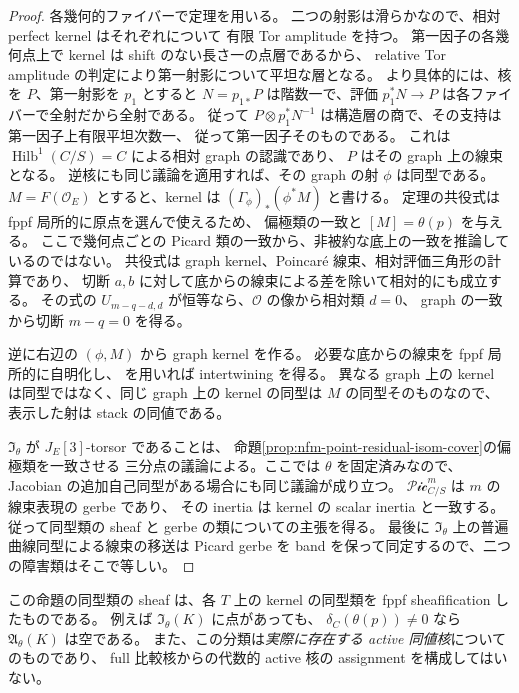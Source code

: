\begin{proof}
各幾何的ファイバーで定理を用いる。
二つの射影は滑らかなので、相対 perfect kernel はそれぞれについて
有限 Tor amplitude を持つ。
第一因子の各幾何点上で kernel は shift のない長さ一の点層であるから、
relative Tor amplitude の判定により第一射影について平坦な層となる。
より具体的には、核を $P$、第一射影を $p_1$ とすると
$N=p_{1*}P$ は階数一で、評価 $p_1^*N\to P$ は各ファイバーで全射だから全射である。
従って $P\otimes p_1^*N^{-1}$ は構造層の商で、その支持は第一因子上有限平坦次数一、
従って第一因子そのものである。
これは $\operatorname{Hilb}^1(C/S)=C$ による相対 graph の認識であり、
$P$ はその graph 上の線束となる。
逆核にも同じ議論を適用すれば、その graph の射 $\phi$ は同型である。
$M=F(\mathcal O_E)$ とすると、kernel は
$(\Gamma_\phi)_*(\phi^*M)$ と書ける。
定理の共役式は fppf 局所的に原点を選んで使えるため、
偏極類の一致と $[M]=\theta(p)$ を与える。
ここで幾何点ごとの Picard 類の一致から、非被約な底上の一致を推論しているのではない。
共役式は graph kernel、Poincar\'e 線束、相対評価三角形の計算であり、
切断 $a,b$ に対して底からの線束による差を除いて相対的にも成立する。
その式の $U_{m-q-d,d}$ が恒等なら、$\mathcal O$ の像から相対類 $d=0$、
graph の一致から切断 $m-q=0$ を得る。

逆に右辺の $(\phi,M)$ から graph kernel を作る。
必要な底からの線束を fppf 局所的に自明化し、
を用いれば intertwining を得る。
異なる graph 上の kernel は同型ではなく、同じ graph 上の kernel の同型は
$M$ の同型そのものなので、表示した射は stack の同値である。

$\mathfrak I_\theta$ が $J_E[3]$-torsor であることは、
命題\ref{prop:nfm-point-residual-isom-cover}の偏極類を一致させる
三分点の議論による。ここでは $\theta$ を固定済みなので、
Jacobian の追加自己同型がある場合にも同じ議論が成り立つ。
$\mathcal{Pic}^{m}_{C/S}$ は $m$ の線束表現の gerbe であり、
その inertia は kernel の scalar inertia と一致する。
従って同型類の sheaf と gerbe の類についての主張を得る。
最後に $\mathfrak I_\theta$ 上の普遍曲線同型による線束の移送は
Picard gerbe を band を保って同定するので、二つの障害類はそこで等しい。
\end{proof}

この命題の同型類の sheaf は、各 $T$ 上の kernel の同型類を
fppf sheafification したものである。
例えば $\mathfrak I_\theta(K)$ に点があっても、
$\delta_C(\theta(p))\ne0$ なら $\mathfrak A_\theta(K)$ は空である。
また、この分類は\emph{実際に存在する active 同値核}についてのものであり、
full 比較核からの代数的 active 核の assignment を構成してはいない。

